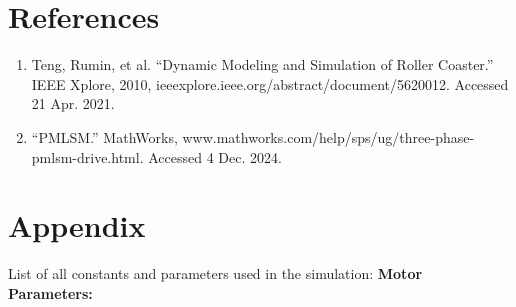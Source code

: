 \documentclass{article}
\begin{document}
    \section{References}
    \begin{enumerate}
        \item Teng, Rumin, et al. “Dynamic Modeling and Simulation of Roller
            Coaster.” IEEE Xplore, 2010, ieeexplore.ieee.org/abstract/document/5620012.
            Accessed 21 Apr. 2021.
        \item “PMLSM.” MathWorks, www.mathworks.com/help/sps/ug/three-phase-pmlsm-drive.html. Accessed 4 Dec. 2024. 
    \end{enumerate}
    \section{Appendix}
    List of all constants and parameters used in the simulation:
    \newline
    \newline
    \textbf{Motor Parameters:}
\end{document}
